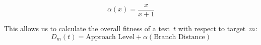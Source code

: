 \documentclass[paper=a4,%
  twoside,%
  BCOR4mm,%
  abstract=true,%
  toc=bibliography,%
  chapterprefix=true,%
  toc=bibliographynumbered,%
  open=right,%
  english,%
  pagesize=pdftex]{scrreprt}
\begin{document}
\[\alpha(x) = \frac{x}{x + 1}\]

This allows us to calculate the overall fitness of a test~$t$ with respect to target~$m$:
\[D_m(t) = \text{Approach Level} + \alpha(\text{Branch Distance})\]


\end{document}
